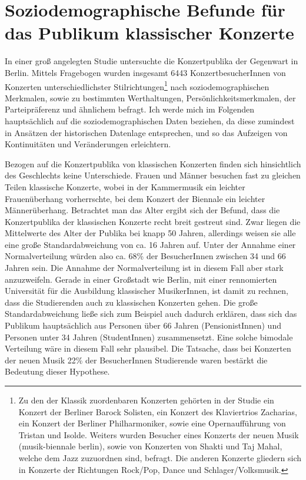 \documentclass[a4paper, german, oneside]{scrbook}
\begin{document}
\section{Soziodemographische Befunde für das Publikum klassischer Konzerte}
In einer groß angelegten Studie untersuchte \textcite{de_la_motte-haber_konzertpublika_2007} die Konzertpublika der Gegenwart in Berlin. Mittels Fragebogen wurden insgesamt 6443 KonzertbesucherInnen von Konzerten unterschiedlichster Stilrichtungen\footnote{Zu den der Klassik zuordenbaren Konzerten gehörten in der Studie ein Konzert der Berliner Barock Solisten, ein Konzert des Klaviertrios Zacharias, ein Konzert der Berliner Philharmoniker, sowie eine Opernaufführung von Tristan und Isolde. Weiters wurden Besucher eines Konzerts der neuen Musik (musik-biennale berlin), sowie von Konzerten von Shakti und Taj Mahal, welche dem Jazz zuzuordnen sind, befragt. Die anderen Konzerte gliedern sich in Konzerte der Richtungen Rock/Pop, Dance und Schlager/Volksmusik.} nach soziodemographischen Merkmalen, sowie zu bestimmten Werthaltungen, Persönlichkeitsmerkmalen, der Parteipräferenz und ähnlichem befragt. Ich werde mich im Folgenden hauptsächlich auf die soziodemographischen Daten beziehen, da diese zumindest in Ansätzen der historischen Datenlage entsprechen, und so das Aufzeigen von Kontinuitäten und Veränderungen erleichtern.

Bezogen auf die Konzertpublika von klassischen Konzerten finden sich hinsichtlich des Geschlechts keine Unterschiede. Frauen und Männer besuchen fast zu gleichen Teilen klassische Konzerte, wobei in der Kammermusik ein leichter Frauenüberhang vorherrschte, bei dem Konzert der Biennale ein leichter Männerüberhang. \parencite[vgl.][484]{de_la_motte-haber_konzertpublika_2007} Betrachtet man das Alter ergibt sich der Befund, dass die Konzertpublika der klassischen Konzerte recht breit gestreut sind. Zwar liegen die Mittelwerte des Alter der Publika bei knapp 50 Jahren, allerdings weisen sie alle eine große Standardabweichung von ca. 16 Jahren auf. Unter der Annahme einer Normalverteilung würden also ca. 68\% der BesucherInnen zwischen 34 und 66 Jahren sein. \parencite[vgl.][480]{de_la_motte-haber_konzertpublika_2007} Die Annahme der Normalverteilung ist in diesem Fall aber stark anzuzweifeln. Gerade in einer Großstadt wie Berlin, mit einer rennomierten Universität für die Ausbildung klassischer MusikerInnen, ist damit zu rechnen, dass die Studierenden auch zu klassischen Konzerten gehen. Die große Standardabweichung ließe sich zum Beispiel auch dadurch erklären, dass sich das Publikum hauptsächlich aus Personen über 66 Jahren (PensionistInnen) und Personen unter 34 Jahren (StudentInnen) zusammensetzt. Eine solche bimodale Verteilung wäre in diesem Fall sehr plausibel. Die Tatsache, dass bei Konzerten der neuen Musik 22\% der BesucherInnen Studierende waren bestärkt die Bedeutung dieser Hypothese. \parencite[vgl.][486]{de_la_motte-haber_konzertpublika_2007}
\end{document}
